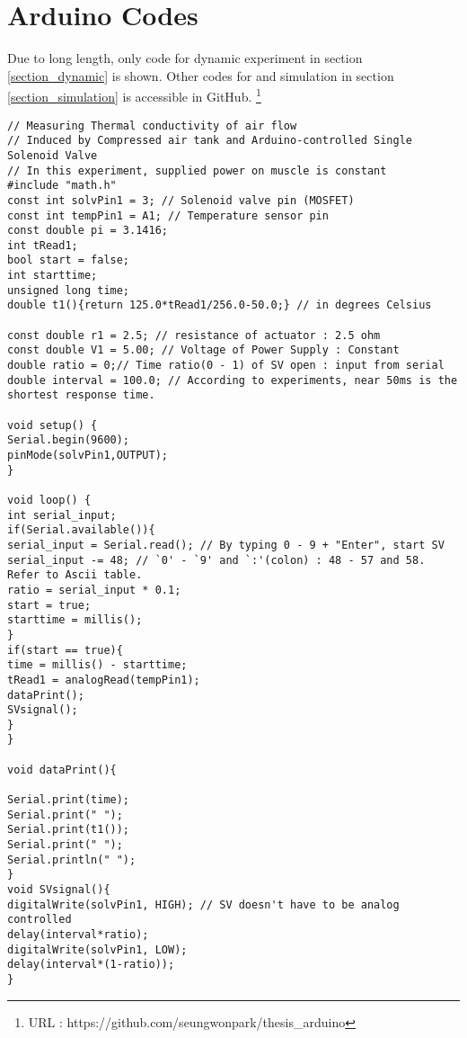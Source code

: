 \section{Arduino Codes}\label{code_dynamic}
Due to long length, only code for dynamic experiment in section \ref{section_dynamic} is shown. Other codes for \apc and simulation in section \ref{section_simulation} is accessible in GitHub.
\footnote{URL : https://github.com/seungwonpark/thesis\_arduino}

\begin{scriptsize}
\begin{verbatim}
// Measuring Thermal conductivity of air flow
// Induced by Compressed air tank and Arduino-controlled Single Solenoid Valve
// In this experiment, supplied power on muscle is constant
#include "math.h"
const int solvPin1 = 3; // Solenoid valve pin (MOSFET)
const int tempPin1 = A1; // Temperature sensor pin
const double pi = 3.1416;
int tRead1;
bool start = false;
int starttime;
unsigned long time;
double t1(){return 125.0*tRead1/256.0-50.0;} // in degrees Celsius

const double r1 = 2.5; // resistance of actuator : 2.5 ohm
const double V1 = 5.00; // Voltage of Power Supply : Constant
double ratio = 0;// Time ratio(0 - 1) of SV open : input from serial
double interval = 100.0; // According to experiments, near 50ms is the shortest response time.

void setup() {
Serial.begin(9600);
pinMode(solvPin1,OUTPUT);
}

void loop() {
int serial_input;
if(Serial.available()){ 
serial_input = Serial.read(); // By typing 0 - 9 + "Enter", start SV
serial_input -= 48; // `0' - `9' and `:'(colon) : 48 - 57 and 58. Refer to Ascii table.
ratio = serial_input * 0.1;
start = true;
starttime = millis();
}
if(start == true){
time = millis() - starttime;
tRead1 = analogRead(tempPin1);
dataPrint();
SVsignal();
}
}

void dataPrint(){

Serial.print(time);
Serial.print(" ");
Serial.print(t1());
Serial.print(" ");
Serial.println(" ");
}
void SVsignal(){
digitalWrite(solvPin1, HIGH); // SV doesn't have to be analog controlled
delay(interval*ratio);
digitalWrite(solvPin1, LOW);
delay(interval*(1-ratio));
}
\end{verbatim}
\end{scriptsize}
